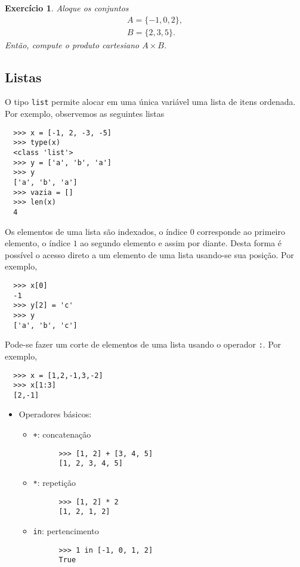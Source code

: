 \documentclass[12pt]{article}
\newtheorem{exr}{Exercício}[section]
\begin{document}
\begin{exr}
  Aloque os conjuntos
  \begin{gather}
    A = \{-1, 0, 2\},\\
    B = \{2, 3, 5\}.
  \end{gather}
  Então, compute o produto cartesiano $A\times B$.
\end{exr}

\subsection{Listas}

O tipo {\python} \verb+list+ permite alocar em uma única variável uma lista de itens ordenada. Por exemplo, observemos as seguintes listas
\begin{lstlisting}
  >>> x = [-1, 2, -3, -5]
  >>> type(x)
  <class 'list'>
  >>> y = ['a', 'b', 'a']
  >>> y
  ['a', 'b', 'a']
  >>> vazia = []
  >>> len(x)
  4
\end{lstlisting}

Os elementos de uma lista são indexados, o índice $0$ corresponde ao primeiro elemento, o índice $1$ ao segundo elemento e assim por diante. Desta forma é possível o acesso direto a um elemento de uma lista usando-se sua posição. Por exemplo,
\begin{lstlisting}
  >>> x[0]
  -1
  >>> y[2] = 'c'
  >>> y
  ['a', 'b', 'c']
\end{lstlisting}
Pode-se fazer um corte de elementos de uma lista usando o operador \verb+:+. Por exemplo,
\begin{lstlisting}
  >>> x = [1,2,-1,3,-2]
  >>> x[1:3]
  [2,-1]
\end{lstlisting}

\begin{itemize}
\item Operadores básicos:
  \begin{itemize}
  \item[] \lstinline-+-: concatenação
    \begin{lstlisting}
      >>> [1, 2] + [3, 4, 5]
      [1, 2, 3, 4, 5]
    \end{lstlisting}
  \item[] \lstinline+*+: repetição
    \begin{lstlisting}
      >>> [1, 2] * 2
      [1, 2, 1, 2]
    \end{lstlisting}
  \item[] \lstinline+in+: pertencimento
    \begin{lstlisting}
      >>> 1 in [-1, 0, 1, 2]
      True
    \end{lstlisting}
  \end{itemize}
\end{itemize}
\end{document}
